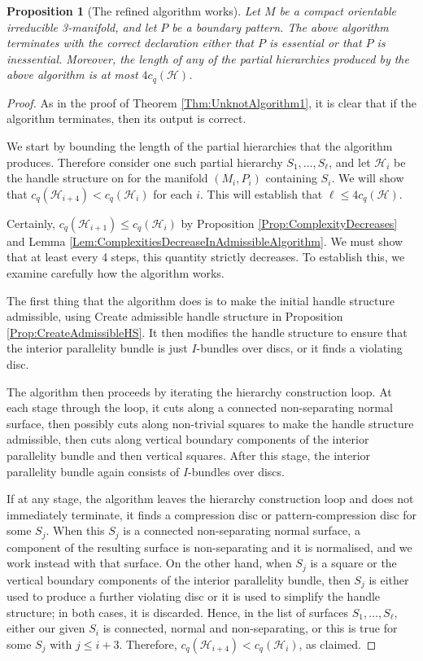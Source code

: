 \documentclass[oneside]{amsart}
\numberwithin{equation}{section}
\theoremstyle{plain}
\newtheorem{proposition}[equation]{Proposition}
\theoremstyle{definition}
\newcommand{\calH}{\mathcal{H}}
\begin{document}
\begin{proposition}[The refined algorithm works]
\label{Prop:RefinedAlgorithmTerminates}
Let $M$ be a compact orientable irreducible 3-manifold, and let $P$ be a boundary pattern.
The above algorithm terminates with the correct declaration either that $P$ is essential or that $P$ is inessential. 
Moreover, the length of any of the partial hierarchies produced by the above algorithm is at most $4c_q(\mathcal{H})$.
\end{proposition}

\begin{proof}
As in the proof of Theorem \ref{Thm:UnknotAlgorithm1}, it is clear that if the algorithm terminates, then its output is correct. 

We start by bounding the length of the partial hierarchies that the algorithm produces. Therefore consider one such partial hierarchy $S_1, \dots, S_\ell$, and let $\calH_i$ be the handle structure on for the manifold $(M_i, P_i)$ containing $S_i$. We will show that $c_q(\calH_{i+4}) < c_q(\calH_i)$ for each $i$. This will establish that $\ell \leq 4 c_q(\calH)$.

Certainly, $c_q(\calH_{i+1}) \leq c_q(\calH_i)$ by Proposition \ref{Prop:ComplexityDecreases} and Lemma \ref{Lem:ComplexitiesDecreaseInAdmissibleAlgorithm}. We must show that at least every 4 steps, this quantity strictly decreases. To establish this, we examine carefully how the algorithm works.

The first thing that the algorithm does is to make the initial handle structure admissible, using  {\sc Create admissible handle structure} in Proposition \ref{Prop:CreateAdmissibleHS}. It then modifies the handle structure to ensure that the interior parallelity bundle is just $I$-bundles over discs, or it finds a violating disc.

The algorithm then proceeds by iterating the hierarchy construction loop. At each stage through the loop, it cuts along a connected non-separating normal surface, then possibly cuts along non-trivial squares to make the handle structure admissible, then cuts along vertical boundary components of the interior parallelity bundle and then vertical squares. After this stage, the interior parallelity bundle again consists of $I$-bundles over discs.

If at any stage, the algorithm leaves the hierarchy construction loop and does not immediately terminate, it finds a compression disc or pattern-compression disc for some $S_j$. When this $S_j$ is a connected non-separating normal surface, a component of the resulting surface is non-separating and it is normalised, and we work instead with that surface. On the other hand, when $S_j$ is a square or the vertical boundary components of the interior parallelity bundle, then $S_j$ is either used to produce a further violating disc or it is used to simplify the handle structure; in both cases, it is discarded. Hence, in the list of surfaces $S_1, \dots, S_\ell$, either our given $S_i$ is connected, normal and non-separating, or this is true for some $S_j$ with $j \leq i + 3$. Therefore, $c_q(\calH_{i+4}) < c_q(\calH_i)$, as claimed.


\end{proof}
\end{document}
